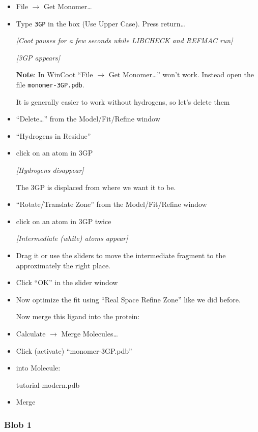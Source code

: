 \documentclass{article}
\begin{document}
\begin{itemize}
\item \textsf{File $\rightarrow$ Get Monomer\ldots}
\item Type \texttt{3GP} in the box (Use Upper Case).  Press return\ldots

\textsl{ [Coot pauses for a few seconds while LIBCHECK and REFMAC run]}

\textsl{ [3GP appears]}

\textbf{Note}: In WinCoot ``File $\rightarrow$ Get Monomer\ldots''
won't work.  Instead open the file \texttt{monomer-3GP.pdb}.

It is generally easier to work without hydrogens, so let's delete
them

\item \textsf{``Delete\ldots''} from the Model/Fit/Refine window
\item \textsf{``Hydrogens in Residue''}
\item click on an atom in 3GP

\textsl{ [Hydrogens disappear]}

The 3GP is displaced from where we want it to be.

\item \textsf{``Rotate/Translate Zone''} from the Model/Fit/Refine
  window
\item click on an atom in 3GP twice

\textsl{ [Intermediate (white) atoms appear]}

\item Drag it or use the sliders to move the intermediate fragment to
  the approximately the right place.
\item Click \textsf{``OK''} in the slider window
\item Now optimize the fit using ``Real Space Refine Zone'' like we did
  before.

Now merge this ligand into the protein:
\item \textsf{Calculate $\rightarrow$ Merge Molecules\ldots}
\item Click (activate) ``monomer-3GP.pdb''
\item into Molecule:
  
  \textsf{tutorial-modern.pdb}

\item \textsf{Merge}

\end{itemize}

\subsubsection{Blob 1}
\end{document}
